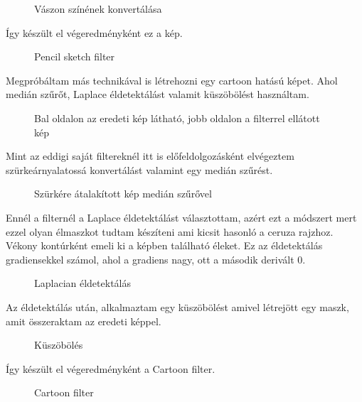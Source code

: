 \begin{figure}[ht] 
\centering
{}
\caption{Vászon színének konvertálása } 
\label{fig: pencil6}
\end{figure}
Így készült el végeredményként ez a kép.
\begin{figure}[ht]
\centering
{}
\caption{Pencil sketch filter } 
\label{fig: pencil7}
\end{figure}
\newpage
{}
Megpróbáltam más technikával is létrehozni egy cartoon hatású képet. Ahol medián szűrőt, Laplace éldetektálást valamit küszöbölést használtam.
\begin{figure}[ht]
\centering
{}
\caption{Bal oldalon az eredeti kép látható, jobb oldalon a filterrel ellátott kép } 
\label{fig: 2_cartoon1}
\end{figure}
Mint az eddigi saját filtereknél itt is előfeldolgozásként elvégeztem szürkeárnyalatossá konvertálást valamint egy  medián szűrést. 
\begin{figure}[ht]
\centering
{}
\caption{Szürkére átalakított kép medián szűrővel  } 
\label{fig:  2_cartoon2}
\end{figure}
Ennél a filternél a Laplace éldetektálást választottam, azért ezt a módszert mert ezzel olyan élmaszkot tudtam készíteni ami kicsit hasonló a ceruza rajzhoz. Vékony kontúrként emeli ki a képben található éleket. Ez az éldetektálás gradiensekkel számol, ahol a gradiens nagy, ott a második derivált 0.
\begin{figure}[ht]
\centering
{}
\caption{Laplacian éldetektálás  } 
\label{fig:  2_cartoon3}
\end{figure}
Az éldetektálás után, alkalmaztam egy küszöbölést amivel létrejött egy maszk, amit összeraktam az eredeti képpel.
\begin{figure}[ht]
\centering
{}
\caption{Küszöbölés  } 
\label{fig:  2_cartoon4}
\end{figure}
Így készült el végeredményként a Cartoon filter.
\begin{figure}[ht]
\centering
{}
\caption{Cartoon filter  } 
\label{fig:  2_cartoon4}
\end{figure}
